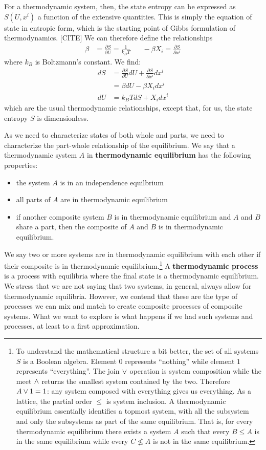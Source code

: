 \documentclass[letterpaper,twocolumn]{article}
\begin{document}
For a thermodynamic system, then, the state entropy can be expressed as $S(U, x^i)$ a function of the extensive quantities. This is simply the equation of state in entropic form, which is the starting point of Gibbs formulation of thermodynamics. [CITE] We can therefore define the relationships
\begin{align}
\beta &= \frac{\partial S}{\partial U} = \frac{1}{k_B T} \;\;\;\;\;\; - \beta X_i = \frac{\partial S}{\partial x^i}
\end{align}
where $k_B$ is Boltzmann's constant. We find:
\begin{align}
dS &= \frac{\partial S}{\partial U} dU + \frac{\partial S}{\partial x^i} dx^i \\
&= \beta dU - \beta X_i dx^i \\
dU &= k_B T dS + X_i dx^i
\end{align}
which are the usual thermodynamic relationships, except that, for us, the state entropy $S$ is dimensionless.

As we need to characterize states of both whole and parts, we need to characterize the part-whole relationship of the equilibrium. We say that a thermodynamic system $A$ in \textbf{thermodynamic equilibrium} has the following properties:
\begin{itemize}
	\item the system $A$ is in an independence equilbrium
	\item all parts of $A$ are in thermodynamic equilibrium
	\item if another composite system $B$ is in thermodynamic equilibrium and $A$ and $B$ share a part, then the composite of $A$ and $B$ is in thermodynamic equilibrium.
\end{itemize}
We say two or more systems are in thermodynamic equilibrium with each other if their composite is in thermodynamic equilibrium.\footnote{To understand the mathematical structure a bit better, the set of all systems $S$ is a Boolean algebra. Element $0$ represents ``nothing'' while element $1$ represents ``everything''. The join $\vee$ operation is system composition while the meet $\wedge$ returns the smallest system contained by the two. Therefore $A \vee 1 = 1$: any system composed with everything gives us everything. As a lattice, the partial order $\leq$ is system inclusion. A thermodynamic equilibrium essentially identifies a topmost system, with all the subsystem and only the subsystems as part of the same equilibrium. That is, for every thermodynamic equilibrium there exists a system $A$ such that every $B \leq A$ is in the same equilibrium while every $C \nleq A$ is not in the same equilibrium.} A \textbf{thermodynamic process} is a process with equilibria where the final state is a thermodynamic equilibrium. We stress that we are not saying that two systems, in general, always allow for thermodynamic equilibria. However, we contend that these are the type of processes we can mix and match to create composite processes of composite systems. What we want to explore is what happens if we had such systems and processes, at least to a first approximation.
\end{document}
